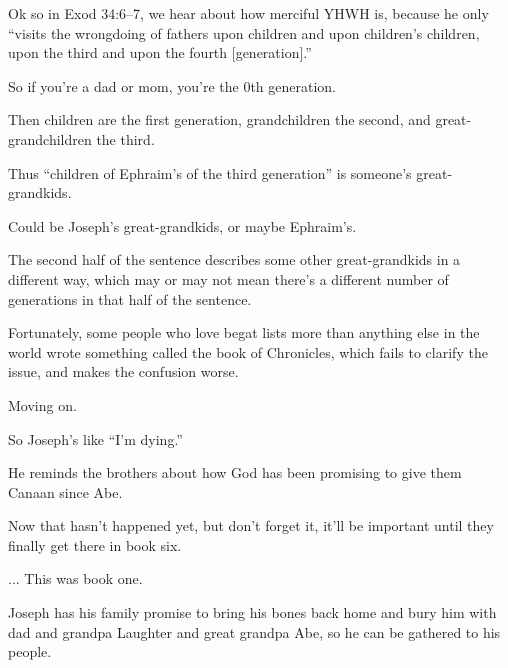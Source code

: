 {
}
{
}
{
	Ok so in Exod 34:6--7, we hear about how merciful YHWH is,
	because he only ``visits the wrongdoing of fathers upon
	children and upon children’s children, upon the third
	and upon the fourth [generation].''
	
	So if you're a dad or mom, you're the 0th generation.

	Then children are the first generation, grandchildren
	the second, and great-grandchildren the third.
	
	Thus ``children of Ephraim's of the third generation''
	is someone's great-grandkids.

	Could be Joseph's great-grandkids, or maybe Ephraim's.

	The second half of the sentence describes some other
	great-grandkids in a different way, which may or may
	not mean there's a different number of generations in
	that half of the sentence.
	
	Fortunately, some people who love begat lists more
	than anything else in the world wrote something
	called the book of Chronicles, which fails to
	clarify the issue, and makes the confusion
	worse.

	Moving on.
}

{
}
{
}
{
	So Joseph's like ``I'm dying.''

	He reminds the brothers about how God has been promising
	to give them Canaan since Abe.

	Now that hasn't happened yet, but don't forget it, it'll
	be important until they finally get there in book six.
	
	... This was book one.
}

{
}
{
}
{
	Joseph has his family promise to bring his bones
	back home and bury him with dad and grandpa Laughter
	and great grandpa Abe, so he can be gathered to his
	people.
}

